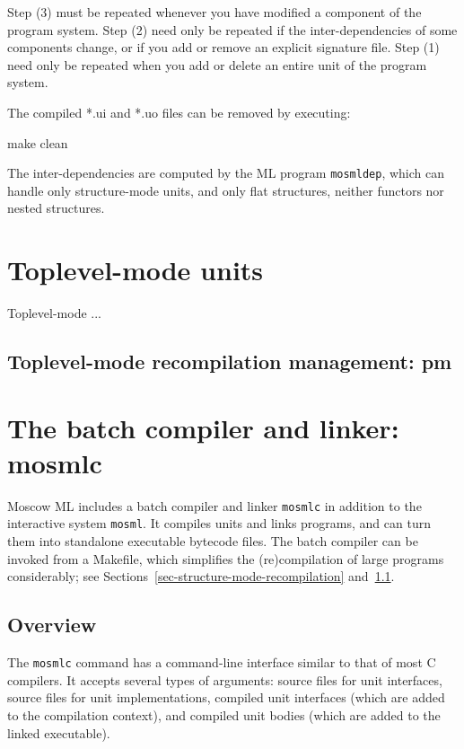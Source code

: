 \documentclass[fleqn]{article}
\begin{document}
\noindent Step (3) must be repeated whenever you have modified a
component of the program system.  Step (2) need only be repeated if
the inter-dependencies of some components change, or if you add or
remove an explicit signature file.  Step (1) need only be repeated
when you add or delete an entire unit of the program system.

The compiled *.ui and *.uo files can be removed by executing:

\begin{program}
make clean  
\end{program}

\noindent The inter-dependencies are computed by the ML program
{\tt mosmldep}, which can handle only structure-mode units, and only
flat structures, neither functors nor nested structures.


\section{Toplevel-mode units}
\label{sec-toplevel-mode}

Toplevel-mode ...


\subsection{Toplevel-mode recompilation management: pm}
\label{sec-program-manager}



\newpage

\section{The batch compiler and linker: mosmlc}
\label{sec-batch-compiler}

Moscow ML includes a batch compiler and linker {\tt mosmlc} in
addition to the interactive system {\tt mosml}.  It compiles units and
links programs, and can turn them into standalone executable bytecode
files.  The batch compiler can be invoked from a Makefile, which
simplifies the (re)compilation of large programs considerably; see
Sections~\ref{sec-structure-mode-recompilation}
and~\ref{sec-program-manager}.


\subsection{Overview}

The {\tt mosmlc} command has a command-line interface similar to that
of most C compilers.  It accepts several types of arguments: source
files for unit interfaces, source files for unit implementations,
compiled unit interfaces (which are added to the compilation context),
and compiled unit bodies (which are added to the linked executable).
\end{document}
